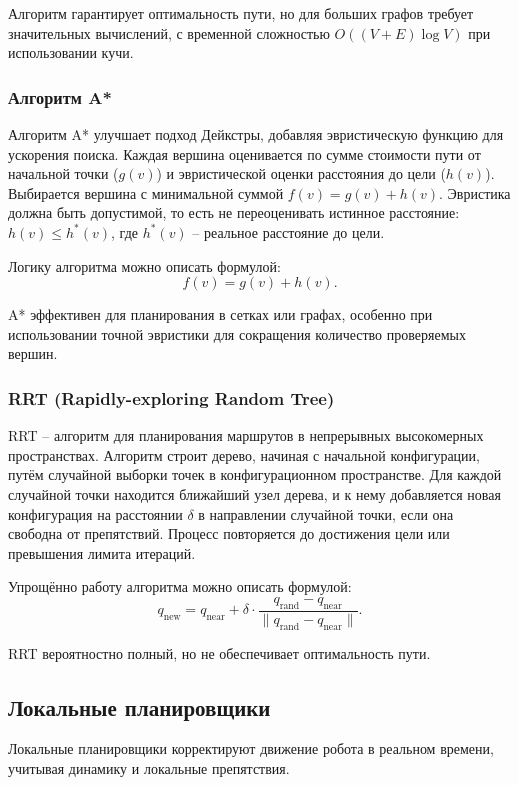 Алгоритм гарантирует оптимальность пути,
но для больших графов требует значительных вычислений,
с временной сложностью $O((V + E) \log V)$ при использовании кучи.

\subsubsection{Алгоритм A*}
Алгоритм A* улучшает подход Дейкстры,
добавляя эвристическую функцию для ускорения поиска.
Каждая вершина оценивается по сумме стоимости пути от начальной точки ($g(v)$)
и эвристической оценки расстояния до цели ($h(v)$).
Выбирается вершина с минимальной суммой $f(v) = g(v) + h(v)$.
Эвристика должна быть допустимой, то есть не переоценивать истинное расстояние: $h(v) \leq h^*(v)$,
где $h^*(v)$ -- реальное расстояние до цели.

Логику алгоритма можно описать формулой:
\begin{equation}
f(v) = g(v) + h(v).
\end{equation}

A* эффективен для планирования в сетках или графах,
особенно при использовании точной эвристики для сокращения количество проверяемых вершин.

\subsubsection{RRT (Rapidly-exploring Random Tree)}
RRT -- алгоритм для планирования маршрутов в непрерывных высокомерных пространствах. 
Алгоритм строит дерево, начиная с начальной конфигурации, 
путём случайной выборки точек в конфигурационном пространстве.
Для каждой случайной точки находится ближайший узел дерева,
и к нему добавляется новая конфигурация на расстоянии $\delta$ в направлении случайной точки,
если она свободна от препятствий. Процесс повторяется до достижения цели или превышения лимита итераций.

Упрощённо работу алгоритма можно описать формулой:
\begin{equation}
q_{\text{new}} = q_{\text{near}} + \delta \cdot \frac{q_{\text{rand}} - q_{\text{near}}}{\| q_{\text{rand}} - q_{\text{near}} \|}.
\end{equation}

RRT вероятностно полный, но не обеспечивает оптимальность пути.

\subsection{Локальные планировщики}
Локальные планировщики корректируют движение робота в реальном времени, учитывая динамику и локальные препятствия.

